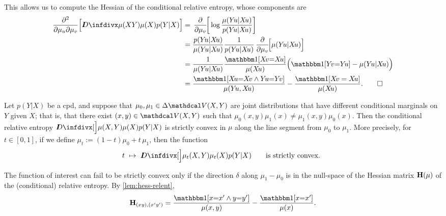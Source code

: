 \begin{subappendices}
\begin{lproof}
    This allows us to compute the Hessian of the conditional relative entropy, whose  components are
    \begin{align*}
        \frac{\partial^2}{\partial \mu_u \partial \mu_v} \Big[ \kldiv{\mu(XY)}{\mu(X)p(Y|X)}\Big]
        &=
        \pd/d\mu_v[ \log \frac{\mu(Y\! u | X\! u)}{  p(Y\! u | X\! u)} ] \\
        &=
        \frac{ p(Y\! u | X\! u)}{\mu(Y\! u | X\! u)} \frac1{ p(Y\! u | X\! u)}
        \pd/d\mu_v[ \mu(Y\! u | X\! u) ] \\
        &= \frac{1}{\mu(Y\! u | X\! u)}
            \frac{\mathbbm1[X\!v{=}X\!u]}{\mu(X\!u)}\Big( \mathbbm1[Y\!v{=}Y\!u] - \mu(Y\!u|X\!u) \Big)\\
        &= \frac{\mathbbm1[X\!u {=} X\!v \land Y\!u {=} Y\!v]}{\mu(Y\! u, X\! u)}
            - \frac{\mathbbm1[X\!v = X\!u]}{\mu(X\!u)}
        . \qedhere
    \end{align*}
\end{lproof}


\begin{lemma}
    Let $p(Y|X)$ be a cpd,
    and suppose that $\mu_0, \mu_1 \in \Delta \V(X,Y)$ are joint distributions that have different conditional marginals on $Y$ given $X$; that is, that
    there exist $(x,y) \in \V(X,Y)$ such that
    $
        \mu_0(x,y) \mu_1(x)  \ne \mu_1(x,y) \mu_0(x).
    $
    Then the conditional relative entropy
    $
        \kldiv[\Big]{ \mu(X,Y) }{ \mu(X) p(Y|X) }
    $
    is strictly convex in $\mu$ along the line segment from $\mu_0$ to $\mu_1$.
    More precisely, for $t \in [0,1]$, if we define
    $\mu_t := (1-t) \mu_0 + t\, \mu_1$, then
    the function
    \[
    t ~\mapsto~ \kldiv[\Big]{ \mu_t(X,Y) }
        {\mu_t(X) p(Y|X)}
        \qquad\text{is strictly convex. }
    \]
    \label{lem:seg-strictcvx}
\end{lemma}
\begin{lproof}
    The function of interest can fail to be strictly convex only if the direction $\delta$ along $\mu_1-\mu_0$ is in the null-space of the Hessian matrix $\mathbf H(\mu)$ of the (conditional) relative entropy.
    By \cref{lem:hess-relent},
    \[
        \mat H_{(xy),(x'y')}
         = \frac{\mathbbm1[x {=} x' \land y {=} y']}{\mu(x,y)}
             - \frac{\mathbbm1[x {=} x']}{\mu(x)}.
    \]


\end{lproof}
\end{subappendices}
